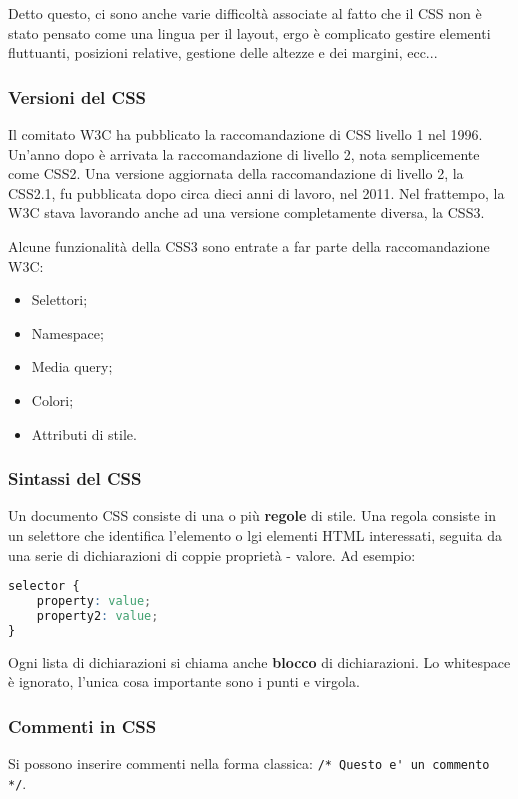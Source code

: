 \documentclass[a4paper,11pt]{article}
\begin{document}
Detto questo, ci sono anche varie difficoltà associate al fatto che il CSS non è stato pensato come una lingua per il layout, ergo è complicato gestire elementi fluttuanti, posizioni relative, gestione delle altezze e dei margini, ecc...

\subsubsection{Versioni del CSS}
Il comitato W3C ha pubblicato la raccomandazione di CSS livello 1 nel 1996.
Un'anno dopo è arrivata la raccomandazione di livello 2, nota semplicemente come CSS2.
Una versione aggiornata della raccomandazione di livello 2, la CSS2.1, fu pubblicata dopo circa dieci anni di lavoro, nel 2011.
Nel frattempo, la W3C stava lavorando anche ad una versione completamente diversa, la CSS3.

Alcune funzionalità della CSS3 sono entrate a far parte della raccomandazione W3C:
\begin{itemize}
	\item Selettori;
	\item Namespace;
	\item Media query;
	\item Colori;
	\item Attributi di stile.
\end{itemize}

\subsubsection{Sintassi del CSS}
Un documento CSS consiste di una o più \textbf{regole} di stile.
Una regola consiste in un selettore che identifica l'elemento o lgi elementi HTML interessati, seguita da una serie di dichiarazioni di coppie proprietà - valore. Ad esempio:

\begin{lstlisting}[language=css, style=codestyle]	
selector { 
	property: value; 
	property2: value; 
}
\end{lstlisting}

Ogni lista di dichiarazioni si chiama anche \textbf{blocco} di dichiarazioni.
Lo whitespace è ignorato, l'unica cosa importante sono i punti e virgola.

\subsubsection{Commenti in CSS}
Si possono inserire commenti nella forma classica: \lstinline|/* Questo e' un commento */|.
\end{document}
